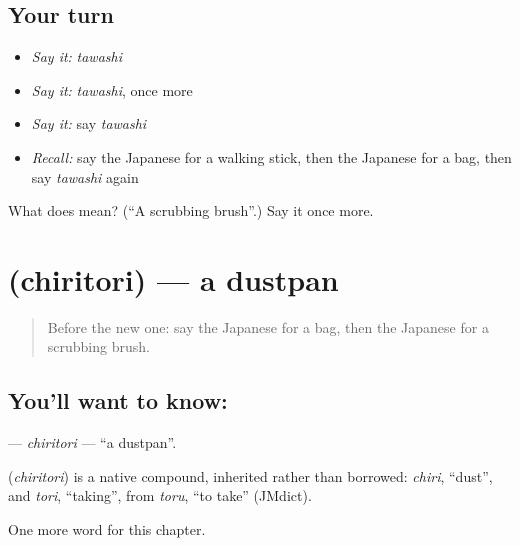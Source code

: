 \subsection*{Your turn}
\begin{itemize}
\raggedright
  \item \emph{Say it:} \emph{tawashi}
  \item \emph{Say it:} \emph{tawashi}, once more
  \item \emph{Say it:} say \emph{tawashi}
  \item \emph{Recall:} say the Japanese for a walking stick, then the Japanese for a bag, then say \emph{tawashi} again
\end{itemize}

\begin{tcolorbox}[breakable,colback=teal!4,colframe=teal!35!black,title={Before you move on}]
What does  mean? (\textquotedblleft{}A scrubbing brush\textquotedblright{}.) Say it once more.
\end{tcolorbox}
\section[\texorpdfstring{\ja{ちりとり} (chiritori)}{ちりとり (chiritori)}]{ (chiritori) — a dustpan}

\label{lesson:JA-C99-chiritori}



\begin{quote}
Before the new one: say the Japanese for a bag, then the Japanese for a scrubbing brush.
\end{quote}

\subsection*{You'll want to know: }
\textbf{} — \emph{chiritori} — \textquotedblleft{}a dustpan\textquotedblright{}.

\begin{cousinweb}
\textbf{} (\emph{chiritori}) is a native compound, inherited rather than borrowed: \emph{chiri}, \textquotedblleft{}dust\textquotedblright{}, and \emph{tori}, \textquotedblleft{}taking\textquotedblright{}, from \emph{toru}, \textquotedblleft{}to take\textquotedblright{} (JMdict).
\end{cousinweb}

\begin{grammarlens}[title={What you've built}]
One more word for this chapter.
\end{grammarlens}

